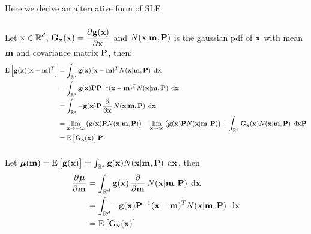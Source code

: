 \documentclass[a4paper,oneside,article]{memoir}
\begin{document}
\begin{table}[h]
	\centering
	
	\label{table:rmse4_1}
\end{table}

\clearpage


\subsection{}\label{sec:4_2}
Here we derive an alternative form of SLF.
\subsubsection{}\label{sec:4_2a}
Let $\mathbf{x}\in\mathbb{R}^d$, $\v{G}_\v{x}(\v{x})=\dpd{\v{g}(\v{x})}{\v{x}}$ and $N(\mathbf{x}|\mathbf{m},\mathbf{P})$ is the gaussian pdf of $\mathbf{x}$ with mean $\mathbf{m}$ and covariance matrix $\mathbf{P}$, then:
\begin{align}
	\E{\v{g}(\v{x})(\v{x}-\v{m})^T}&=\defint{\R^d}{}{\v{g}(\v{x})(\v{x}-\v{m})^TN(\v{x}|\v{m},\v{P})}{\v{x}}\\
	&=\defint{\R^d}{}{\v{g}(\v{x})\v{P}\v{P}^{-1}(\v{x}-\v{m})^TN(\v{x}|\v{m},\v{P})}{\v{x}}\\
	&=\defint{\R^d}{}{-\v{g}(\v{x})\v{P}\dpd{}{\v{x}}N(\v{x}|\v{m},\v{P})}{\v{x}}\\
	&=\lim_{\v{x}\to-\infty}\left(\v{g}(\v{x})\v{P}N(\v{x}|\v{m},\v{P})\right)-\lim_{\v{x}\to\infty}\left(\v{g}(\v{x})\v{P}N(\v{x}|\v{m},\v{P})\right)+\defint{\R^d}{}{\v{G}_{\v{x}}(\v{x})N(\v{x}|\v{m},\v{P})}{\v{x}}\v{P}\\
	&=\E{\v{G}_{\v{x}}(\v{x})}\v{P}
\end{align}

\subsubsection{}\label{sec:4_2b}
Let $\gv{\mu}(\v{m})=\E{\v{g}(\v{x})}=\defint{\R^d}{}{\v{g}(\v{x})N(\v{x}|\v{m},\v{P})}{\v{x}}$, then
\begin{align}
	\dpd{\gv{\mu}}{\v{m}}&=\defint{\R^d}{}{\v{g}(\v{x})\dpd{}{\v{m}}N(\v{x}|\v{m},\v{P})}{\v{x}}\\
	&=\defint{\R^d}{}{-\v{g}(\v{x})\v{P}^{-1}(\v{x}-\v{m})^TN(\v{x}|\v{m},\v{P})}{\v{x}}\\
	&=\E{\v{G}_{\v{x}}(\v{x})}
\end{align}
\end{document}
